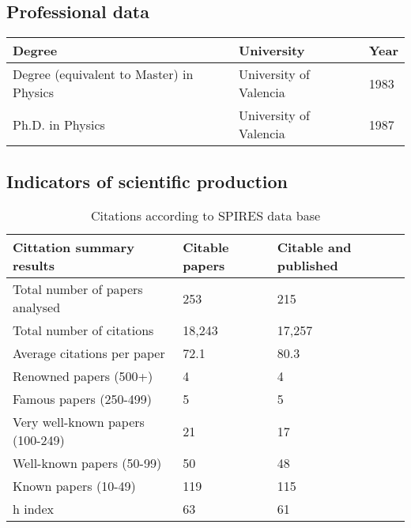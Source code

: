 \documentclass[a4paper,11pt,oneside]{article}
\begin{document}
\subsection{Professional data}
\begin{table}[h!]
\begin{center}
\begin{tabular}{| l | l | l | }
\hline
Degree & University & Year\\
\hline
Degree (equivalent to Master) in Physics & University of Valencia & 1983 \\
Ph.D. in Physics & University of Valencia & 1987 \\
\hline
\end{tabular}
\label{tab:academic}
\end{center}
\end{table} 

\subsection{Indicators of scientific production}

\begin{table}[h!]
\begin{center}
\caption{Citations according to SPIRES data base}
\begin{tabular}{| l | l | l | }
\hline
Cittation summary results & Citable papers & Citable and published\\
\hline
Total number of papers analysed &	253	&215\\
Total number of citations &	18,243	& 17,257 \\
Average citations per paper &	72.1 &	80.3 \\
Renowned papers (500+)	 & 4	& 4 \\
Famous papers (250-499)	 & 5	& 5 \\
Very well-known papers (100-249) &	21 &	17\\
Well-known papers (50-99) &	50 &	48\\
Known papers (10-49) &	119	& 115\\
h index &63 &	61\\
\hline
\end{tabular}
\label{tab:spires}
\end{center}
\end{table} 
\end{document}
